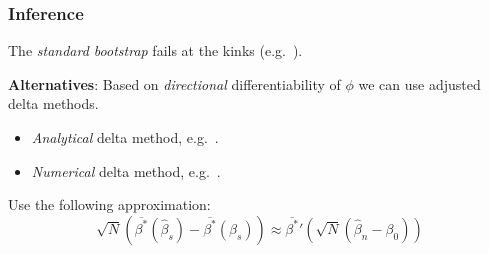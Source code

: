 \documentclass[11pt, aspectratio=169]{beamer}
\begin{document}
\begin{frame}
    \frametitle{Inference}

    The \textit{standard bootstrap} fails at the kinks (e.g.~\citet{fang2019infdirdiff}).

    \vspace{0.5cm}

    \textbf{Alternatives}: Based on \textit{directional} differentiability of $\phi$ we can use adjusted delta methods.
    \begin{itemize}
        \item \textit{Analytical} delta method, e.g.~\cite{fang2019infdirdiff}.
        \item \textit{Numerical} delta method, e.g.~\cite{hong2018numerical}.
    \end{itemize}

    \vspace{0.5cm}
    Use the following approximation:
    \begin{equation*}
        \sqrt{N}\left({\overline{\beta^*}(\hat{\beta}_s)} - \overline{\beta^*}(\beta_s)\right) \approx \overline{\beta^*}'\left(\sqrt{N}\left(\hat{\beta}_n - \beta_0\right)\right)
    \end{equation*}


\end{frame}


\end{document}
